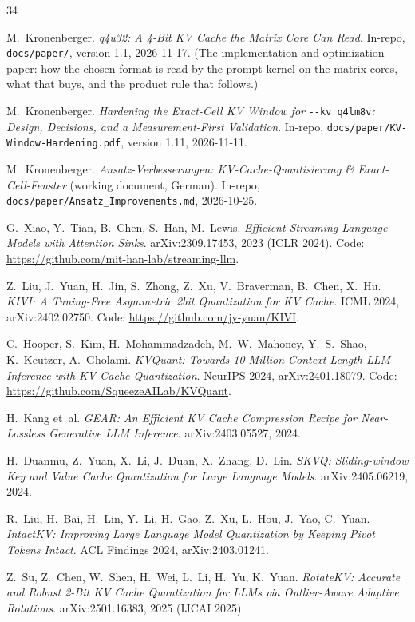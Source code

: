 \documentclass[10pt,twocolumn]{article}
\begin{document}
\begin{thebibliography}{34}
\setlength{\itemsep}{0pt}\footnotesize\raggedright

M.~Kronenberger.
\emph{q4u32: A 4-Bit KV Cache the Matrix Core Can Read}.
In-repo, \texttt{docs/paper/}, version 1.1, 2026-11-17.
(The implementation and optimization paper: how the chosen format is read by the prompt kernel on the matrix
cores, what that buys, and the product rule that follows.)

M.~Kronenberger.
\emph{Hardening the Exact-Cell KV Window for} \texttt{-{}-kv q4lm8v}\emph{: Design, Decisions, and a Measurement-First Validation}.
In-repo, \texttt{docs/paper/KV-Window-Hardening.pdf}, version 1.11, 2026-11-11.

M.~Kronenberger.
\emph{Ansatz-Verbesserungen: KV-Cache-Quantisierung \& Exact-Cell-Fenster} (working document, German).
In-repo, \texttt{docs/paper/Ansatz\_Improvements.md}, 2026-10-25.

G.~Xiao, Y.~Tian, B.~Chen, S.~Han, M.~Lewis.
\emph{Efficient Streaming Language Models with Attention Sinks}.
arXiv:2309.17453, 2023 (ICLR 2024). Code: \url{https://github.com/mit-han-lab/streaming-llm}.

Z.~Liu, J.~Yuan, H.~Jin, S.~Zhong, Z.~Xu, V.~Braverman, B.~Chen, X.~Hu.
\emph{KIVI: A Tuning-Free Asymmetric 2bit Quantization for KV Cache}.
ICML 2024, arXiv:2402.02750. Code: \url{https://github.com/jy-yuan/KIVI}.

C.~Hooper, S.~Kim, H.~Mohammadzadeh, M.~W.~Mahoney, Y.~S.~Shao, K.~Keutzer, A.~Gholami.
\emph{KVQuant: Towards 10 Million Context Length LLM Inference with KV Cache Quantization}.
NeurIPS 2024, arXiv:2401.18079. Code: \url{https://github.com/SqueezeAILab/KVQuant}.

H.~Kang et~al.
\emph{GEAR: An Efficient KV Cache Compression Recipe for Near-Lossless Generative LLM Inference}.
arXiv:2403.05527, 2024.

H.~Duanmu, Z.~Yuan, X.~Li, J.~Duan, X.~Zhang, D.~Lin.
\emph{SKVQ: Sliding-window Key and Value Cache Quantization for Large Language Models}.
arXiv:2405.06219, 2024.

R.~Liu, H.~Bai, H.~Lin, Y.~Li, H.~Gao, Z.~Xu, L.~Hou, J.~Yao, C.~Yuan.
\emph{IntactKV: Improving Large Language Model Quantization by Keeping Pivot Tokens Intact}.
ACL Findings 2024, arXiv:2403.01241.

Z.~Su, Z.~Chen, W.~Shen, H.~Wei, L.~Li, H.~Yu, K.~Yuan.
\emph{RotateKV: Accurate and Robust 2-Bit KV Cache Quantization for LLMs via Outlier-Aware Adaptive Rotations}.
arXiv:2501.16383, 2025 (IJCAI 2025).


\end{thebibliography}
\end{document}
